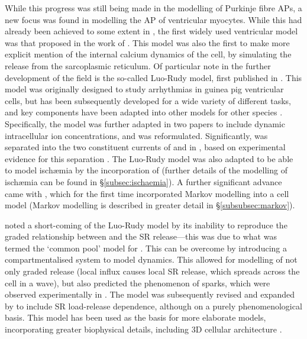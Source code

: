 \documentclass[../thesis-main.tex]{subfiles}
\begin{document}
While this progress was still being made in the modelling of Purkinje fibre APs, a new focus was found in modelling the AP of ventricular myocytes. While this had already been achieved to some extent in \citet{Krause1966}, the first widely used ventricular model was that proposed in the work of \citet{Beeler1977}. This model was also the first to make more explicit mention of the internal calcium dynamics of the cell, by simulating the \ca{} release from the sarcoplasmic reticulum. Of particular note in the further development of the field is the so-called Luo-Rudy model, first published in \citet{Luo1991}. This model was originally designed to study arrhythmias in guinea pig ventricular cells, but has been subsequently developed for a wide variety of different tasks, and key components have been adapted into other models for other species \citep{Shaw1997a, Shaw1997b, Wagner1999, Viswanathan1999, Garfinkel2000, Shannon2004, Mahajan2008}. Specifically, the model was further adapted in two papers \citep{Luo1994, Luo1994a} to include dynamic intracellular ion concentrations, and \ica{} was reformulated. Significantly, \ik{} was separated into the two constituent currents of \ikr{} and \iks{} in \citet{Zeng1995}, based on experimental evidence for this separation \citep{Sanguinetti1990}. The Luo-Rudy model was also adapted to be able to model isch\ae{}mia by the incorporation of \ikatp{} \citep{Shaw1997} (further details of the modelling of isch\ae{}mia can be found in \S\ref{subsec:ischaemia}). A further significant advance came with \citet{Clancy1999}, which for the first time incorporated Markov modelling into a cell model (Markov modelling is described in greater detail in \S\ref{subsubsec:markov}).

\citet{Stern1992} noted a short-coming of the Luo-Rudy model by its inability to reproduce the graded relationship between \ica{} and the SR \ca{} release---this was due to what was termed the `common pool' model for \ca{}. This can be overcome by introducing a compartmentalised system to model \ca{} dynamics. This allowed for modelling of not only graded \ca{} release (local \ica{} influx causes local SR \ca{} release, which spreads across the cell in a \ca{} wave), but also predicted the phenomenon of \ca{} sparks, which were observed experimentally in \citet{Cleemann1998}. The model was subsequently revised and expanded by \citet{Shiferaw2003} to include SR load-release dependence, although on a purely phenomenological basis. This model has been used as the basis for more elaborate models, incorporating greater biophysical details, including 3D cellular architecture \citep{Restrepo2008, Chen2009}.
\end{document}
